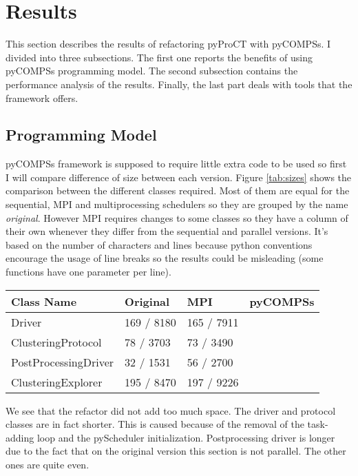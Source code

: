 \chapter{Results}


This section describes the results of refactoring pyProCT with pyCOMPSs. I divided into three subsections. The first one reports the benefits of using pyCOMPSs programming model. The second subsection contains the performance analysis of the results. Finally, the last part deals with tools that the framework offers.

\section{Programming Model}

pyCOMPSs framework is supposed to require little extra code to be used so first I will compare difference of size between each version. Figure \ref{tab:sizes} shows the comparison between the different classes required. Most of them are equal for the sequential, MPI and multiprocessing schedulers so they are grouped by the name \textit{original}. However MPI requires changes to some classes so they have a column of their own whenever they differ from the sequential and parallel versions. It's based on the number of characters and lines because python conventions encourage the usage of line breaks so the results could be misleading (some functions have one parameter per line).


\begin{center}
	\begin{tabular}{| R{6cm} | L{3cm} | L{3cm} |}
		\hline
		Class Name & Original & MPI & pyCOMPSs \\ 
		\hline
		\hline
		Driver & 169 / 8180  &  165 / 7911 \\
		\hline
		ClusteringProtocol & 78 / 3703 & 73 / 3490 \\
		\hline
		PostProcessingDriver & 32 / 1531 & 56 / 2700 \\
		\hline
		ClusteringExplorer & 195 / 8470 & 197 / 9226 \\ 
		\hline
	\end{tabular}
	\label{tab:sizes}
\end{center}


We see that the refactor did not add too much space. The driver and protocol classes are in fact shorter. This is caused because of the removal of the task-adding loop and the pyScheduler initialization. Postprocessing driver is longer due to the fact that on the original version this section is not parallel. The other ones are quite even.

